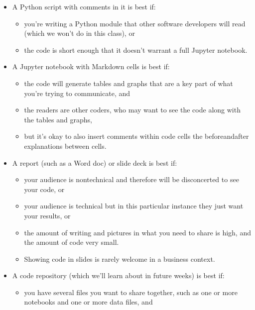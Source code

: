 \documentclass[letterpaper,10pt,english]{sphinxmanual}
\begin{document}
\begin{itemize}
\item {} 
A Python script with comments in it is best if:
\begin{itemize}
\item {} 
you’re writing a Python module that other software developers will read (which we won’t do in this class), or

\item {} 
the code is short enough that it doesn’t warrant a full Jupyter notebook.

\end{itemize}

\item {} 
A Jupyter notebook with Markdown cells is best if:
\begin{itemize}
\item {} 
the code will generate tables and graphs that are a key part of what you’re trying to communicate, and

\item {} 
the readers are other coders, who may want to see the code along with the tables and graphs,

\item {} 
but it’s okay to also insert comments within code cells  the before\sphinxhyphen{}and\sphinxhyphen{}after explanations between cells.

\end{itemize}

\item {} 
A report (such as a Word doc) or slide deck is best if:
\begin{itemize}
\item {} 
your audience is nontechnical and therefore will be disconcerted to see your code, or

\item {} 
your audience is technical but in this particular instance they just want your results, or

\item {} 
the amount of writing and pictures in what you need to share is high, and the amount of code very small.

\item {} 
Showing code in slides is rarely welcome in a business context.

\end{itemize}

\item {} 
A code repository (which we’ll learn about in future weeks) is best if:
\begin{itemize}
\item {} 
you have several files you want to share together, such as one or more notebooks and one or more data files, and


\end{itemize}
\end{itemize}
\end{document}
